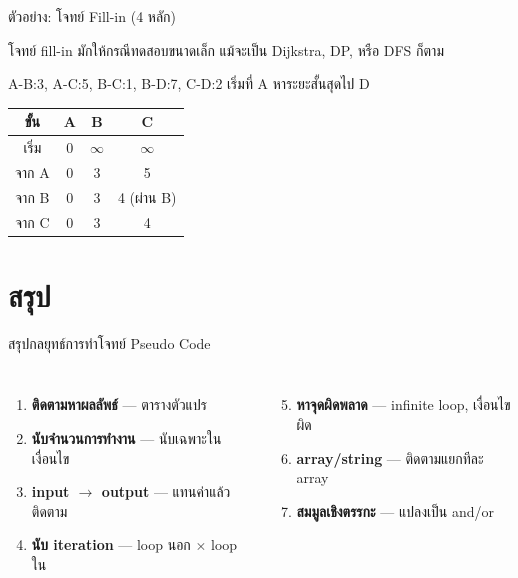 \documentclass[11pt, aspectratio=169]{beamer}
\begin{document}
\begin{frame}{ตัวอย่าง: โจทย์ Fill-in (4 หลัก)}
  \begin{explanation}
    โจทย์ fill-in มักให้กรณีทดสอบขนาดเล็ก
    แม้จะเป็น Dijkstra, DP, หรือ DFS ก็ตาม
  \end{explanation}

  \begin{exambox}
    A-B:3, A-C:5, B-C:1, B-D:7, C-D:2 เริ่มที่ A หาระยะสั้นสุดไป D

    \begin{tabular}{c|c|c|c}
      \textbf{ขั้น} & A & B & C \\
      \hline
      เริ่ม & 0 & $\infty$ & $\infty$ \\
      จาก A & 0 & 3 & 5 \\
      จาก B & 0 & 3 & 4 (ผ่าน B) \\
      จาก C & 0 & 3 & 4 \\
    \end{tabular}

  \end{exambox}
\end{frame}

\section{สรุป}

\begin{frame}{สรุปกลยุทธ์การทำโจทย์ Pseudo Code}
  \begin{explanation}
    \begin{columns}[T]
        \begin{enumerate}
          \item \textbf{ติดตามหาผลลัพธ์} — ตารางตัวแปร
          \item \textbf{นับจำนวนการทำงาน} — นับเฉพาะในเงื่อนไข
          \item \textbf{input $\to$ output} — แทนค่าแล้วติดตาม
          \item \textbf{นับ iteration} — loop นอก $\times$ loop ใน
        \end{enumerate}
        \begin{enumerate}
          \setcounter{enumi}{4}
          \item \textbf{หาจุดผิดพลาด} — infinite loop, เงื่อนไขผิด
          \item \textbf{array/string} — ติดตามแยกทีละ array
          \item \textbf{สมมูลเชิงตรรกะ} — แปลงเป็น and/or
        \end{enumerate}
    \end{columns}

  \end{explanation}
\end{frame}
\end{document}

